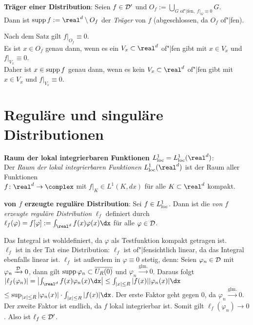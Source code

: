 \textbf{Träger einer Distribution}:
Seien $f \in \mathcal{D}'$ und
$O_f := \bigcup_{G \text{ of"|fen},\; f|_G \equiv 0} G$.\\
Dann ist $\supp f := \real^d \setminus O_f$ der \emph{Träger} von $f$
(abgeschlossen, da $O_f$ of"|fen).

Nach dem Satz gilt $f|_{O_f} \equiv 0$.\\
Es ist $x \in O_f$ genau dann, wenn es ein
$V_x \subset \real^d$ of"|fen gibt mit $x \in V_x$ und $f|_{V_x} \equiv 0$.\\
Daher ist $x \in \operatorname{supp} f$ genau dann, wenn es kein
$V_x \subset \real^d$ of"|fen gibt mit $x \in V_x$ und $f|_{V_x} \equiv 0$.

\pagebreak

\section{%
    Reguläre und singuläre Distributionen%
}

\textbf{Raum der lokal integrierbaren Funktionen
$L^1_\loc = L^1_\loc(\real^d)$}:\\
Der \emph{Raum der lokal integrierbaren Funktionen $L^1_\loc(\real^d)$} ist
der Raum aller Funktionen\\
$f\colon \real^d \rightarrow \complex$ mit
$f|_K \in L^1(K, dx)$ für alle $K \subset \real^d$ kompakt.

\textbf{von $f$ erzeugte reguläre Distribution}:
Sei $f \in L^1_{{\operatorname{loc}}}$.
Dann ist die \emph{von $f$ erzeugte reguläre Distribution} $\ell_f$ definiert
durch $\ell_f(\varphi) = f[\varphi] := \int_{\real^d} f(x) \varphi(x) \dx$
für alle $\varphi \in \mathcal{D}$.

Das Integral ist wohldefiniert, da $\varphi$ als Testfunktion
kompakt getragen ist.\\
$\ell_f$ ist in der Tat eine Distribution:
$\ell_f$ ist of"|fensichtlich linear, da das Integral ebenfalls linear ist.
$\ell_f$ ist außerdem in $\varphi \equiv 0$ stetig, denn:
Seien $\varphi_n \in \mathcal{D}$ mit $\varphi_n \xrightarrow{\mathcal{D}} 0$,
dann gilt $\operatorname{supp} \varphi_n \subset \overline{U_R(0)}$ und
$\varphi_n \xrightarrow{\text{glm.}} 0$.
Daraus folgt $|\ell_f(\varphi_n)| =
\left|\int_{\real^d} f(x) \varphi_n(x) \dx\right| \le
\int_{|x| \le R} |f(x)| |\varphi_n(x)| \dx$\\
$\le \sup_{|x| \le R} |\varphi_n(x)| \cdot \int_{|x| \le R} |f(x)| \dx$.
Der erste Faktor geht gegen $0$, da $\varphi_n \xrightarrow{\text{glm.}} 0$.
Der zweite Faktor ist endlich, da $f$ lokal integrierbar ist.
Somit gilt $\ell_f(\varphi_n) \to 0$.
Also ist $\ell_f \in \mathcal{D}'$.

